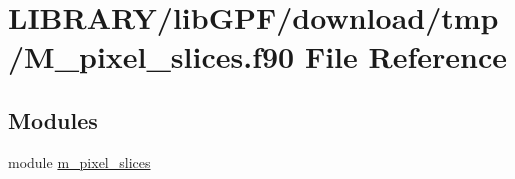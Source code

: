 \hypertarget{M__pixel__slices_8f90}{}\section{L\+I\+B\+R\+A\+R\+Y/lib\+G\+P\+F/download/tmp/\+M\+\_\+pixel\+\_\+slices.f90 File Reference}
\label{M__pixel__slices_8f90}
\subsection*{Modules}
\begin{DoxyCompactItemize}
\item 
module \hyperlink{namespacem__pixel__slices}{m\+\_\+pixel\+\_\+slices}
\end{DoxyCompactItemize}
